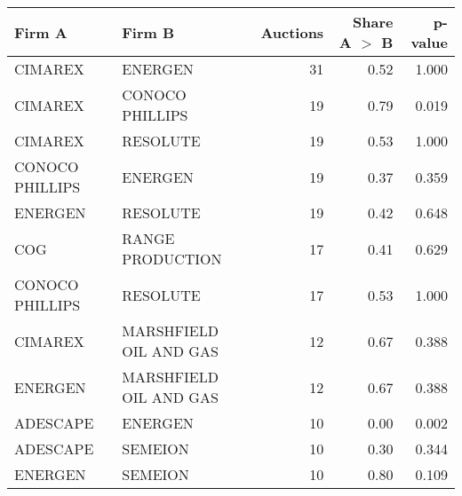 
\begin{tabular}{llrrr}
\toprule
Firm A & Firm B & Auctions & Share A $>$ B & p-value\\
\midrule
CIMAREX & ENERGEN & 31 & 0.52 & 1.000\\
CIMAREX & CONOCO PHILLIPS & 19 & 0.79 & 0.019\\
CIMAREX & RESOLUTE & 19 & 0.53 & 1.000\\
CONOCO PHILLIPS & ENERGEN & 19 & 0.37 & 0.359\\
ENERGEN & RESOLUTE & 19 & 0.42 & 0.648\\
COG & RANGE PRODUCTION & 17 & 0.41 & 0.629\\
CONOCO PHILLIPS & RESOLUTE & 17 & 0.53 & 1.000\\
CIMAREX & MARSHFIELD OIL AND GAS & 12 & 0.67 & 0.388\\
ENERGEN & MARSHFIELD OIL AND GAS & 12 & 0.67 & 0.388\\
ADESCAPE & ENERGEN & 10 & 0.00 & 0.002\\
ADESCAPE & SEMEION & 10 & 0.30 & 0.344\\
ENERGEN & SEMEION & 10 & 0.80 & 0.109\\
\bottomrule
\end{tabular}
